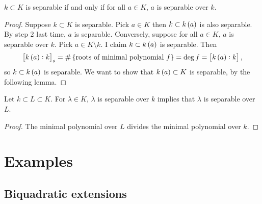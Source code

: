 \begin{corollary}
$ k \subset K $ is separable if and only if for all $ a \in K $, $ a $ is separable over $ k $.
\end{corollary}

\begin{proof}
Suppose $ k \subset K $ is separable. Pick $ a \in K $ then $ k \subset k\br{a} $ is also separable. By step $ 2 $ last time, $ a $ is separable. Conversely, suppose for all $ a \in K $, $ a $ is separable over $ k $. Pick $ a \in K \setminus k $. I claim $ k \subset k\br{a} $ is separable. Then
$$ \sbr{k\br{a} : k}_s = \#\cbr{\text{roots of minimal polynomial} \ f} = \deg f = \sbr{k\br{a} : k}, $$
so $ k \subset k\br{a} $ is separable. We want to show that $ k\br{a} \subset K $ is separable, by the following lemma.
\end{proof}

\begin{lemma}
Let $ k \subset L \subset K $. For $ \lambda \in K $, $ \lambda $ is separable over $ k $ implies that $ \lambda $ is separable over $ L $.
\end{lemma}

\begin{proof}
The minimal polynomial over $ L $ divides the minimal polynomial over $ k $.
\end{proof}

\pagebreak

\section{Examples}

\subsection{Biquadratic extensions}

